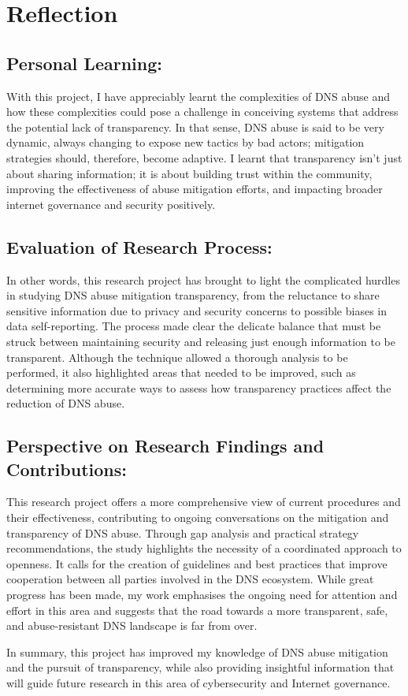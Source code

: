 \section{Reflection}
\subsection{Personal Learning: } 

With this project, I have appreciably learnt the complexities of DNS abuse and how these complexities could pose a challenge in conceiving systems that address the potential lack of transparency. In that sense, DNS abuse is said to be very dynamic, always changing to expose new tactics by bad actors; mitigation strategies should, therefore, become adaptive.  I learnt that transparency isn't just about sharing information; it is about building trust within the community, improving the effectiveness of abuse mitigation efforts, and impacting broader internet governance and security positively.

\subsection{Evaluation of Research Process:  }

In other words, this research project has brought to light the complicated hurdles in studying DNS abuse mitigation transparency, from the reluctance to share sensitive information due to privacy and security concerns to possible biases in data self-reporting. The process made clear the delicate balance that must be struck between maintaining security and releasing just enough information to be transparent. Although the technique allowed a thorough analysis to be performed, it also highlighted areas that needed to be improved, such as determining more accurate ways to assess how transparency practices affect the reduction of DNS abuse.



\subsection{Perspective on Research Findings and Contributions: }

This research project offers a more comprehensive view of current procedures and their effectiveness, contributing to ongoing conversations on the mitigation and transparency of DNS abuse. Through gap analysis and practical strategy recommendations, the study highlights the necessity of a coordinated approach to openness. It calls for the creation of guidelines and best practices that improve cooperation between all parties involved in the DNS ecosystem. While great progress has been made, my work emphasises the ongoing need for attention and effort in this area and suggests that the road towards a more transparent, safe, and abuse-resistant DNS landscape is far from over.


In summary, this project has improved my knowledge of DNS abuse mitigation and the pursuit of transparency, while also providing insightful information that will guide future research in this area of cybersecurity and Internet governance.


